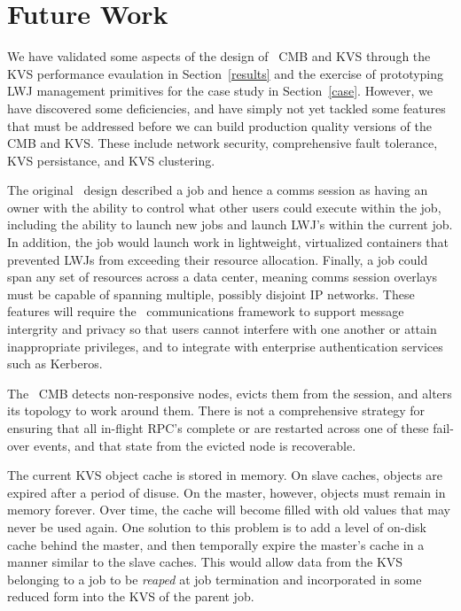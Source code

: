 \section{Future Work}

We have validated some aspects of the design of \flux\ CMB and KVS
through the KVS performance evaulation in Section~\ref{results}
and the exercise of prototyping LWJ management primitives for the
case study in Section~\ref{case}.  However, we have discovered some
deficiencies, and have simply not yet tackled some features
that must be addressed before we can build production
quality versions of the CMB and KVS.
These include network security, comprehensive fault tolerance,
KVS persistance, and KVS clustering.

The original \flux\ design described a job and hence a comms session
as having an owner with the ability to control what other users could
execute within the job, including the ability to launch new jobs and
launch LWJ's within the current job.  In addition, the job would launch
work in lightweight, virtualized containers that prevented LWJs from
exceeding their resource allocation.  Finally, a job could span any set
of resources across a data center, meaning comms session overlays must
be capable of spanning multiple, possibly disjoint IP networks.
These features will require the \flux\ communications framework to
support message intergrity and privacy so that users cannot interfere
with one another or attain inappropriate privileges, and to integrate with
enterprise authentication services such as Kerberos.

The \flux\ CMB detects non-responsive nodes, evicts them from
the session, and alters its topology to work around them.
There is not a comprehensive strategy for ensuring that all in-flight
RPC's complete or are restarted across one of these fail-over events,
and that state from the evicted node is recoverable.

The current KVS object cache is stored in memory.
On slave caches, objects are expired after a period of disuse.
On the master, however, objects must remain in memory forever.
Over time, the cache will become filled with old values that may never
be used again.  One solution to this problem is to add a level of
on-disk cache behind the master, and then temporally expire the master's
cache in a manner similar to the slave caches.  This would allow data from
the KVS belonging to a job to be {\em reaped} at job termination and
incorporated in some reduced form into the KVS of the parent job.

